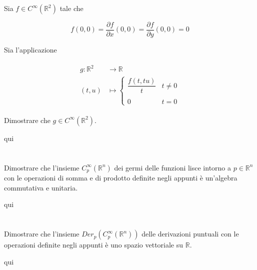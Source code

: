 \begin{tcolorbox}
	Sia $ f \in C^{\infty}(\mathbb{R}^{2}) $ tale che
	
	\begin{equation}
		f(0,0) = \dfrac{\partial f}{\partial x} (0,0) = \dfrac{\partial f}{\partial y} (0,0) = 0
	\end{equation}

	Sia l'applicazione
	
	\begin{align}
		\begin{split}
			g : \mathbb{R}^{2} & \to \mathbb{R}\\
			(t,u) &\mapsto%
			\begin{cases}
				\dfrac{f(t,tu)}{t} & t \neq 0\\\\
				0 & t = 0
			\end{cases}
		\end{split}
	\end{align}
	
	Dimostrare che $ g \in C^{\infty}(\mathbb{R}^{2}) $.
\end{tcolorbox}

qui

\tocless\section{}\label{es1-7}

\begin{tcolorbox}
	Dimostrare che l'insieme $ C_{p}^{\infty}(\mathbb{R}^{n}) $ dei germi delle funzioni lisce intorno a $ p \in \mathbb{R}^{n} $ con le operazioni di somma e di prodotto definite negli appunti è un'algebra commutativa e unitaria.
\end{tcolorbox}

qui

\tocless\section{}\label{es1-8}

\begin{tcolorbox}
	Dimostrare che l'insieme $ Der_{p}(C_{p}^{\infty}(\mathbb{R}^{n})) $ delle derivazioni puntuali con le operazioni definite negli appunti è uno spazio vettoriale su $ \mathbb{R} $.
\end{tcolorbox}

qui

\tocless\section{}\label{es1-9}

